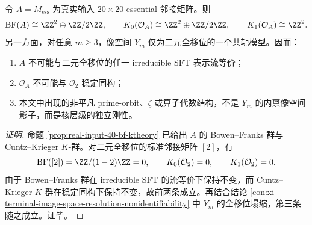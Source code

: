 \begin{conclusion}\label{con:xi-terminal-kernel-flow-k-separation-from-fullshift}
令 \(A=M_{\mathrm{ess}}\) 为真实输入 \(20\times 20\) essential 邻接矩阵。则
\[
\mathrm{BF}(A)\cong \ZZ^2\oplus \ZZ/2\ZZ,\qquad
K_0(\mathcal O_A)\cong \ZZ^2\oplus \ZZ/2\ZZ,\qquad
K_1(\mathcal O_A)\cong \ZZ^2.
\]
另一方面，对任意 \(m\ge 3\)，像空间 \(Y_m\) 仅为二元全移位的一个共轭模型。因而：
\begin{enumerate}
  \item \(A\) 不可能与二元全移位的任一 irreducible SFT 表示流等价；
  \item \(\mathcal O_A\) 不可能与 \(\mathcal O_2\) 稳定同构；
  \item 本文中出现的非平凡 prime-orbit、\(\zeta\) 或算子代数结构，不是 \(Y_m\) 的内禀像空间影子，而是核层级的独立刚性。
\end{enumerate}
\end{conclusion}
\begin{proof}[证明]
命题 \ref{prop:real-input-40-bf-ktheory} 已给出 \(A\) 的 Bowen--Franks 群与 Cuntz--Krieger \(K\)-群。对二元全移位的标准邻接矩阵 \([2]\)，有
\[
\mathrm{BF}([2])=\ZZ/(1-2)\ZZ=0,\qquad
K_0(\mathcal O_2)=0,\qquad
K_1(\mathcal O_2)=0.
\]
由于 Bowen--Franks 群在 irreducible SFT 的流等价下保持不变，而 Cuntz--Krieger \(K\)-群在稳定同构下保持不变，故前两条成立。再结合结论 \ref{con:xi-terminal-image-space-resolution-nonidentifiability} 中 \(Y_m\) 的全移位塌缩，第三条随之成立。证毕。
\end{proof}

